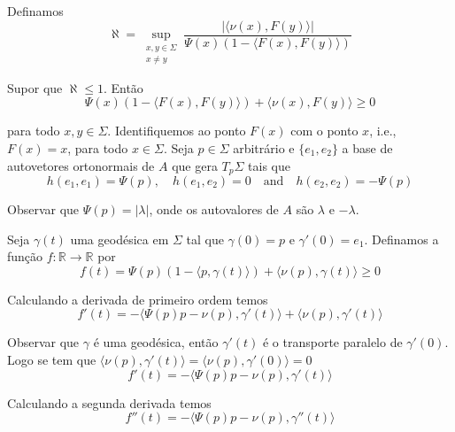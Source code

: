 \begin{demonstracao}
	Definamos
	\begin{equation*}
		\aleph = \sup_{\substack{x,y \in \Sigma\\ x \neq y}} \frac{| \langle  \nu(x), F(y) \rangle |}{\Psi(x) (1 - \langle F(x), F(y) \rangle)}
	\end{equation*}
	
	Supor que $\aleph \leq 1$. Então
	\begin{equation*}
		\Psi(x) (1 - \langle F(x), F(y) \rangle) + \langle \nu(x), F(y) \rangle \geq 0
	\end{equation*}
	
	para todo $ x,y \in \Sigma $. Identifiquemos ao ponto $F(x)$ com o ponto $x$, i.e., $F(x) = x$, para todo $x \in \Sigma$. Seja $p \in \Sigma$ arbitrário e $\{ e_1, e_2 \}$ a base de autovetores ortonormais de $A$ que gera $T_{p} \Sigma$ tais que
	\begin{equation*}
		h(e_1,e_1) = \Psi(p), \quad h(e_1,e_2)=0 \quad \text{and} \quad h(e_2,e_2) = -\Psi(p)
	\end{equation*}
	
	Observar que $\Psi(p) = |\lambda|$, onde os autovalores de $A$ são $\lambda$ e $-\lambda$.
	
	Seja $\gamma(t)$ uma geodésica em $\Sigma$ tal que $\gamma(0)=p$ e $\gamma'(0)=e_1$. Definamos a função $f: \mathbb{R} \rightarrow \mathbb{R}$ por
	\begin{equation*}
		f(t) = \Psi(p) (1 - \langle p, \gamma(t) \rangle) + \langle \nu(p), \gamma(t) \rangle \geq 0
	\end{equation*}
	
	Calculando a derivada de primeiro ordem temos
	\begin{equation*}
		f'(t) = -\langle \Psi(p) p - \nu(p), \gamma'(t) \rangle + \langle \nu(p), \gamma'(t) \rangle
	\end{equation*}
	
	Observar que $ \gamma $ é uma geodésica, então $ \gamma'(t) $ é  o transporte paralelo de $ \gamma'(0) $. Logo se tem que $ \langle \nu(p), \gamma'(t) \rangle = \langle \nu(p), \gamma'(0) \rangle = 0 $
	\begin{equation*}
		f'(t) = -\langle \Psi(p) p - \nu(p), \gamma'(t) \rangle
	\end{equation*}
	
	Calculando a segunda derivada temos
	\begin{equation*}
		f''(t) = -\langle \Psi(p) p - \nu(p), \gamma''(t) \rangle
	\end{equation*}
	

\end{demonstracao}
